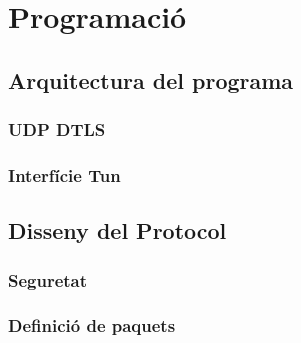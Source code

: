 \chapter{Programació}
\section{Arquitectura del programa}
\subsection{UDP DTLS}
\subsection{Interfície Tun}

\section{Disseny del Protocol}
\subsection{Seguretat}
\subsection{Definició de paquets}
